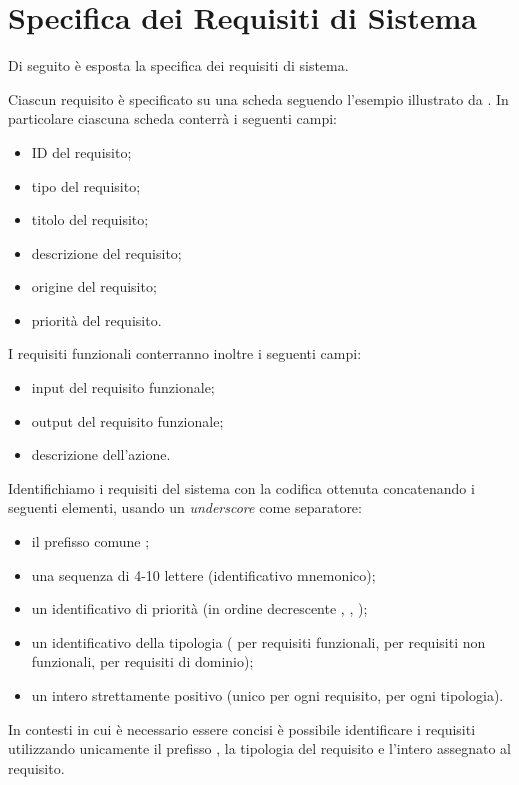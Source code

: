 
\section{Specifica dei Requisiti di Sistema}

Di seguito \`e esposta la specifica dei requisiti di sistema.

Ciascun requisito \`e specificato su una scheda seguendo l'esempio illustrato da \cite[p. 97]{sommerville}.
In particolare ciascuna scheda conterr\`a i seguenti campi:
\begin{itemize}
	\item ID del requisito;
	\item tipo del requisito;
	\item titolo del requisito;
	\item descrizione del requisito;
	\item origine del requisito;
	\item priorit\`a del requisito.
\end{itemize}
I requisiti funzionali conterranno inoltre i seguenti campi:
\begin{itemize}
	\item input del requisito funzionale;
	\item output del requisito funzionale;
	\item descrizione dell'azione.
\end{itemize}

Identifichiamo i requisiti del sistema con la codifica ottenuta concatenando i seguenti elementi, usando un \emph{underscore} come separatore:
\begin{itemize}
	\item il prefisso comune ;
	\item una sequenza di 4-10 lettere (identificativo mnemonico);
	\item un identificativo di priorit\`a (in ordine decrescente , , );
	\item un identificativo della tipologia ( per requisiti funzionali,  per requisiti non funzionali,  per requisiti di dominio);
	\item un intero strettamente positivo (unico per ogni requisito, per ogni tipologia).
\end{itemize}
In contesti in cui \`e necessario essere concisi \`e possibile identificare i requisiti utilizzando unicamente il prefisso , la tipologia del requisito e l'intero assegnato al requisito.



